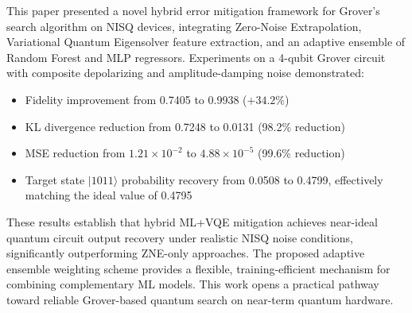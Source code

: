 \documentclass[journal]{IEEEtran}
\begin{document}
This paper presented a novel hybrid error mitigation framework for Grover's search algorithm on NISQ devices, integrating Zero-Noise Extrapolation, Variational Quantum Eigensolver feature extraction, and an adaptive ensemble of Random Forest and MLP regressors. Experiments on a 4-qubit Grover circuit with composite depolarizing and amplitude-damping noise demonstrated:
\begin{itemize}
  \item Fidelity improvement from 0.7405 to 0.9938 ($+34.2\%$)
  \item KL divergence reduction from 0.7248 to 0.0131 (98.2\% reduction)
  \item MSE reduction from $1.21 \times 10^{-2}$ to $4.88 \times 10^{-5}$ (99.6\% reduction)
  \item Target state $|1011\rangle$ probability recovery from 0.0508 to 0.4799, effectively matching the ideal value of 0.4795
\end{itemize}

These results establish that hybrid ML+VQE mitigation achieves near-ideal quantum circuit output recovery under realistic NISQ noise conditions, significantly outperforming ZNE-only approaches. The proposed adaptive ensemble weighting scheme provides a flexible, training-efficient mechanism for combining complementary ML models. This work opens a practical pathway toward reliable Grover-based quantum search on near-term quantum hardware.
\end{document}
